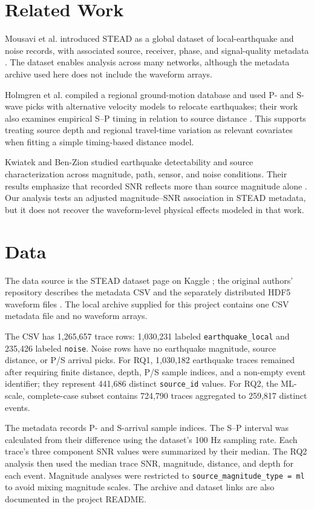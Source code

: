 \documentclass[sigconf,nonacm]{acmart}
\begin{document}
\section{Related Work}
Mousavi et al. introduced STEAD as a global dataset of local-earthquake and noise records, with associated source, receiver, phase, and signal-quality metadata \cite{stead}. The dataset enables analysis across many networks, although the metadata archive used here does not include the waveform arrays.

Holmgren et al. compiled a regional ground-motion database and used P- and S-wave picks with alternative velocity models to relocate earthquakes; their work also examines empirical S--P timing in relation to source distance \cite{holmgren}. This supports treating source depth and regional travel-time variation as relevant covariates when fitting a simple timing-based distance model.

Kwiatek and Ben-Zion studied earthquake detectability and source characterization across magnitude, path, sensor, and noise conditions. Their results emphasize that recorded SNR reflects more than source magnitude alone \cite{kwiatek}. Our analysis tests an adjusted magnitude--SNR association in STEAD metadata, but it does not recover the waveform-level physical effects modeled in that work.

\section{Data}
The data source is the STEAD dataset page on Kaggle \cite{kaggle}; the original authors' repository describes the metadata CSV and the separately distributed HDF5 waveform files \cite{stead}. The local archive supplied for this project contains one CSV metadata file and no waveform arrays.

The CSV has 1,265,657 trace rows: 1,030,231 labeled \texttt{earthquake\_local} and 235,426 labeled \texttt{noise}. Noise rows have no earthquake magnitude, source distance, or P/S arrival picks. For RQ1, 1,030,182 earthquake traces remained after requiring finite distance, depth, P/S sample indices, and a non-empty event identifier; they represent 441,686 distinct \texttt{source\_id} values. For RQ2, the ML-scale, complete-case subset contains 724,790 traces aggregated to 259,817 distinct events.

The metadata records P- and S-arrival sample indices. The S--P interval was calculated from their difference using the dataset's 100 Hz sampling rate. Each trace's three component SNR values were summarized by their median. The RQ2 analysis then used the median trace SNR, magnitude, distance, and depth for each event. Magnitude analyses were restricted to \texttt{source\_magnitude\_type = ml} to avoid mixing magnitude scales. The archive and dataset links are also documented in the project README.
\end{document}
